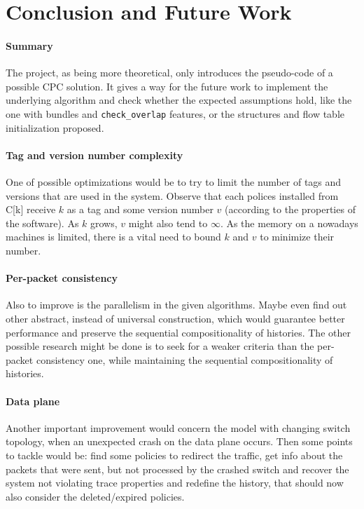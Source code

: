 \documentclass{article}
\newtheorem{lemma}{Lemma}
\theoremstyle{remark}
\begin{document}
%
%
\section{Conclusion and Future Work}
\paragraph{Summary} The project, as being more theoretical, only introduces the pseudo-code of a possible CPC solution. It gives a way for the future work to implement the underlying algorithm and check whether the expected assumptions hold, like the one with bundles and \texttt{check\_overlap} features, or the structures and flow table initialization proposed.
\paragraph{Tag and version number complexity}
One of possible optimizations would be to try to limit the number of tags and versions that are used in the system. Observe that each polices installed from C[k] receive $k$ as a tag and some version number $v$ (according to the properties of the software). As $k$ grows, $v$ might also tend to $\infty$. As the memory on a nowadays machines is limited, there is a vital need to bound $k$ and $v$ to minimize their number.
\paragraph{Per-packet consistency}
Also to improve is the parallelism in the given algorithms. Maybe even find out other abstract, instead of universal construction, which would guarantee better performance and preserve the sequential compositionality of histories.
The other possible research might be done is to seek for a weaker criteria than the per-packet consistency one, while maintaining the sequential compositionality of histories.
\paragraph{Data plane}
Another important improvement would concern the model with changing switch topology, when an unexpected crash on the data plane occurs. Then some points to tackle would be: find some policies to redirect the traffic, get info about the packets that were sent, but not processed by the crashed switch and recover the system not violating trace properties and redefine the history, that should now also consider the deleted/expired policies. 
\end{document}
